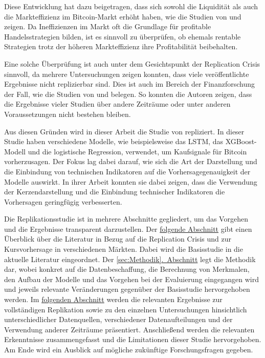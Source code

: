 \documentclass[a4paper, 12pt]{article}
\begin{document}
Diese Entwicklung hat dazu beigetragen, dass sich sowohl die Liquidität als auch die Markteffizienz im Bitcoin-Markt erhöht haben, wie die Studien von \textcite{Tran2020} und \textcite{Yi_2023} zeigen.
Da Ineffizienzen im Markt oft die Grundlage für profitable Handelsstrategien bilden, ist es sinnvoll zu überprüfen, ob ehemals rentable Strategien trotz der höheren Markteffizienz ihre Profitabilität beibehalten.
\vspace{\baselineskip}

Eine solche Überprüfung ist auch unter dem Gesichtspunkt der Replication Crisis sinnvoll, da mehrere Untersuchungen zeigen konnten, dass viele veröffentlichte Ergebnisse nicht replizierbar sind.
Dies ist auch im Bereich der Finanzforschung der Fall, wie die Studien von \textcite{Mclean2016} und \textcite{Linnainmaa2018} belegen.
So konnten die Autoren zeigen, dass die Ergebnisse vieler Studien über andere Zeiträume oder unter anderen Voraussetzungen nicht bestehen bleiben.
\vspace{\baselineskip}

Aus diesen Gründen wird in dieser Arbeit die Studie  von \textcite{Goutte2023} repliziert.
In dieser Studie haben \citeauthor{Goutte2023} verschiedene Modelle, wie beispielsweise das LSTM, das XGBoost-Modell und die logistische Regression, verwendet, um Kaufsignale für Bitcoin vorherzusagen.
Der Fokus lag dabei darauf, wie sich die Art der Darstellung und die Einbindung von technischen Indikatoren auf die Vorhersagegenauigkeit der Modelle auswirkt.
In ihrer Arbeit konnten sie dabei zeigen, dass die Verwendung der Kerzendarstellung und die Einbindung technischer Indikatoren die Vorhersagen geringfügig verbesserten.

Die Replikationsstudie ist in mehrere Abschnitte gegliedert, um das Vorgehen und die Ergebnisse transparent darzustellen.
Der \hyperref[sec:Literatur]{folgende Abschnitt} gibt einen Überblick über die Literatur in Bezug auf die Replication Crisis und zur Kursvorhersage in verschiedenen Märkten.
Dabei wird die Basisstudie in die aktuelle Literatur eingeordnet.
Der \hyperref[sec:Methodik]{\ref*{sec:Methodik}.~Abschnitt} legt die Methodik dar, wobei konkret auf die Datenbeschaffung, die Berechnung von Merkmalen, den Aufbau der Modelle und das Vorgehen bei der Evaluierung eingegangen wird und jeweils relevante Veränderungen gegenüber der Basisstudie hervorgehoben werden.
Im \hyperref[sec:Ergebnisse]{folgenden Abschnitt} werden die relevanten Ergebnisse zur vollständigen Replikation sowie zu den einzelnen Untersuchungen hinsichtlich unterschiedlicher Datenquellen, verschiedener Datenaufteilungen und der Verwendung anderer Zeiträume präsentiert.
Anschließend werden die relevanten Erkenntnisse zusammengefasst und die Limitationen dieser Studie hervorgehoben.
Am Ende wird ein Ausblick auf mögliche zukünftige Forschungsfragen gegeben.
\end{document}
